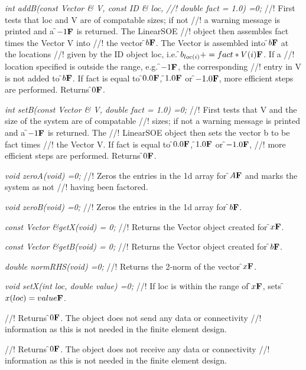 {\em int addB(const Vector \& V, const ID \& loc,
//! double fact = 1.0) =0;}
//! First tests that \p loc and \p V are of compatable sizes; if not
//! a warning message is printed and a \f$-1{\bf F}$ is returned. The LinearSOE
//! object then assembles \p fact times the Vector \p V into
//! the vector \f$b{\bf F}$. The Vector is assembled into \f$b{\bf F}$ at the locations
//! given by the ID object \p loc, i.e. \f$b_{loc(i)} += fact * V(i){\bf F}$. If a
//! location specified is outside the range, e.g. \f$-1{\bf F}$, the corresponding
//! entry in \p V is not added to \f$b{\bf F}$. If \p fact is equal to \f$0.0{\bf F}$,
\f$1.0{\bf F}$ or \f$-1.0{\bf F}$, more efficient steps are performed. Returns \f$0{\bf F}$.


{\em int setB(const Vector \& V, double fact = 1.0) =0;}
//! First tests that \p V and the size of the system are of compatable
//! sizes; if not a warning message is printed and a \f$-1{\bf F}$ is returned. The
//! LinearSOE object then sets the vector \p b to be \p fact times
//! the Vector \p V. If \p fact is equal to \f$0.0{\bf F}$, \f$1.0{\bf F}$ or \f$-1.0{\bf F}$,
//! more efficient steps are performed. Returns \f$0{\bf F}$. 

{\em void zeroA(void) =0;}
//! Zeros the entries in the 1d array for \f$A{\bf F}$ and marks the system as not
//! having been factored.

{\em void zeroB(void) =0;}
//! Zeros the entries in the 1d array for \f$b{\bf F}$.

{\em const Vector \&getX(void) = 0;}
//! Returns the Vector object created for \f$x{\bf F}$.

{\em const Vector \&getB(void) = 0;}
//! Returns the Vector object created for \f$b{\bf F}$.

{\em double normRHS(void) =0;}
//! Returns the 2-norm of the vector \f$x{\bf F}$.

{\em void setX(int loc, double value) =0;}
//! If \p loc is within the range of \f$x{\bf F}$, sets \f$x(loc) = value{\bf F}$.

//! Returns \f$0{\bf F}$. The object does not send any data or connectivity
//! information as this is not needed in the finite element design.

//! Returns \f$0{\bf F}$. The object does not receive any data or connectivity
//! information as this is not needed in the finite element design.




